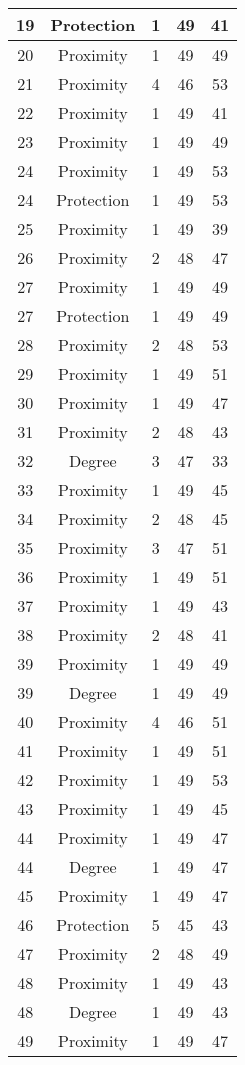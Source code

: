 \documentclass[results.tex]{subfiles}
\begin{document}
\begin{center}
\begin{tabular}{| c || c | c | c | c |}
    \hline
    19 & Protection & 1 & 49 & 41 \\ 
    \hline
    20 & Proximity & 1 & 49 & 49 \\ 
    \hline
    21 & Proximity & 4 & 46 & 53 \\ 
    \hline
    22 & Proximity & 1 & 49 & 41 \\ 
    \hline
    23 & Proximity & 1 & 49 & 49 \\ 
    \hline
    24 & Proximity & 1 & 49 & 53 \\ 
    \hline
    24 & Protection & 1 & 49 & 53 \\ 
    \hline
    25 & Proximity & 1 & 49 & 39 \\ 
    \hline
    26 & Proximity & 2 & 48 & 47 \\ 
    \hline
    27 & Proximity & 1 & 49 & 49 \\ 
    \hline
    27 & Protection & 1 & 49 & 49 \\ 
    \hline
    28 & Proximity & 2 & 48 & 53 \\ 
    \hline
    29 & Proximity & 1 & 49 & 51 \\ 
    \hline
    30 & Proximity & 1 & 49 & 47 \\ 
    \hline
    31 & Proximity & 2 & 48 & 43 \\ 
    \hline
    32 & Degree & 3 & 47 & 33 \\ 
    \hline
    33 & Proximity & 1 & 49 & 45 \\ 
    \hline
    34 & Proximity & 2 & 48 & 45 \\ 
    \hline
    35 & Proximity & 3 & 47 & 51 \\ 
    \hline
    36 & Proximity & 1 & 49 & 51 \\ 
    \hline
    37 & Proximity & 1 & 49 & 43 \\ 
    \hline
    38 & Proximity & 2 & 48 & 41 \\ 
    \hline
    39 & Proximity & 1 & 49 & 49 \\ 
    \hline
    39 & Degree & 1 & 49 & 49 \\ 
    \hline
    40 & Proximity & 4 & 46 & 51 \\ 
    \hline
    41 & Proximity & 1 & 49 & 51 \\ 
    \hline
    42 & Proximity & 1 & 49 & 53 \\ 
    \hline
    43 & Proximity & 1 & 49 & 45 \\ 
    \hline
    44 & Proximity & 1 & 49 & 47 \\ 
    \hline
    44 & Degree & 1 & 49 & 47 \\ 
    \hline
    45 & Proximity & 1 & 49 & 47 \\ 
    \hline
    46 & Protection & 5 & 45 & 43 \\ 
    \hline
    47 & Proximity & 2 & 48 & 49 \\ 
    \hline
    48 & Proximity & 1 & 49 & 43 \\ 
    \hline
    48 & Degree & 1 & 49 & 43 \\ 
    \hline
    49 & Proximity & 1 & 49 & 47 \\ 
    \hline   \end{tabular}
\end{center}
\end{document}
